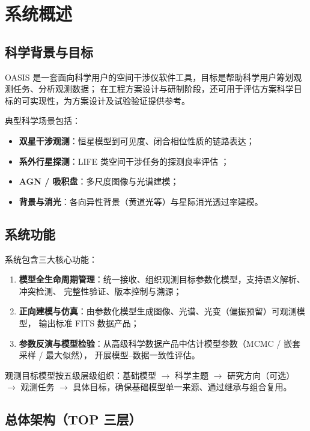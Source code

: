 \section{系统概述}

\subsection{科学背景与目标}

OASIS 是一套面向科学用户的空间干涉仪软件工具，目标是帮助科学用户筹划观测任务、分析观测数据；
在工程方案设计与研制阶段，还可用于评估方案科学目标的可实现性，为方案设计及试验验证提供参考。

典型科学场景包括：
\begin{itemize}
  \item \textbf{双星干涉观测}：恒星模型到可见度、闭合相位性质的链路表达；
  \item \textbf{系外行星探测}：LIFE 类空间干涉任务的探测良率评估 \cite{quanz2022life}；
  \item \textbf{AGN / 吸积盘}：多尺度图像与光谱建模；
  \item \textbf{背景与消光}：各向异性背景（黄道光等）与星际消光透过率建模。
\end{itemize}

\subsection{系统功能}

系统包含三大核心功能：

\begin{enumerate}
  \item \textbf{模型全生命周期管理}：统一接收、组织观测目标参数化模型，支持语义解析、冲突检测、
        完整性验证、版本控制与溯源；
  \item \textbf{正向建模与仿真}：由参数化模型生成图像、光谱、光变（偏振预留）可观测模型，
        输出标准 FITS 数据产品；
  \item \textbf{参数反演与模型检验}：从高级科学数据产品中估计模型参数（MCMC / 嵌套采样 / 最大似然），
        开展模型--数据一致性评估。
\end{enumerate}

观测目标模型按五级层级组织：基础模型 $\rightarrow$ 科学主题 $\rightarrow$ 研究方向（可选）
$\rightarrow$ 观测任务 $\rightarrow$ 具体目标，确保基础模型单一来源、通过继承与组合复用。

\subsection{总体架构（TOP 三层）}


